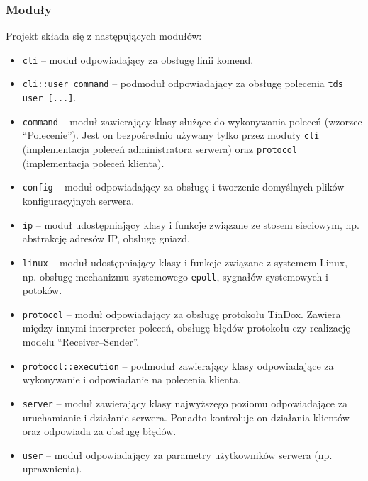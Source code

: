 \documentclass[8pt,a4paper]{article}
\newcommand{\quotes}[1]{``#1''}
\begin{document}
\subsubsection{Moduły}
\noindent Projekt składa się z następujących modułów:
\begin{itemize}
    \item \texttt{cli} -- moduł odpowiadający za obsługę linii komend.
    \item \texttt{cli::user\_command} -- podmoduł odpowiadający za obsługę polecenia \texttt{tds user [...]}.
    \item \texttt{command} -- moduł zawierający klasy służące do wykonywania poleceń (wzorzec \quotes{\href{https://en.wikipedia.org/wiki/Command_pattern}{Polecenie}}). Jest on bezpośrednio używany tylko przez moduły \texttt{cli} (implementacja poleceń administratora serwera) oraz \texttt{protocol} (implementacja poleceń klienta).
    \item \texttt{config} -- moduł odpowiadający za obsługę i tworzenie domyślnych plików konfiguracyjnych serwera.
    \item \texttt{ip} -- moduł udostępniający klasy i funkcje związane ze stosem sieciowym, np. abstrakcję adresów IP, obsługę gniazd.
    \item \texttt{linux} -- moduł udostępniający klasy i funkcje związane z systemem Linux, np. obsługę mechanizmu systemowego \texttt{epoll}, sygnałów systemowych i potoków.
    \item \texttt{protocol} -- moduł odpowiadający za obsługę protokołu TinDox. Zawiera między innymi interpreter poleceń, obsługę błędów protokołu czy realizację modelu \quotes{Receiver--Sender}.
    \item \texttt{protocol::execution} -- podmoduł zawierający klasy odpowiadające za wykonywanie i odpowiadanie na polecenia klienta.
    \item \texttt{server} -- moduł zawierający klasy najwyższego poziomu odpowiadające za uruchamianie i działanie serwera. Ponadto kontroluje on działania klientów oraz odpowiada za obsługę błędów.
    \item \texttt{user} -- moduł odpowiadający za parametry użytkowników serwera (np. uprawnienia).
\end{itemize}
\end{document}
